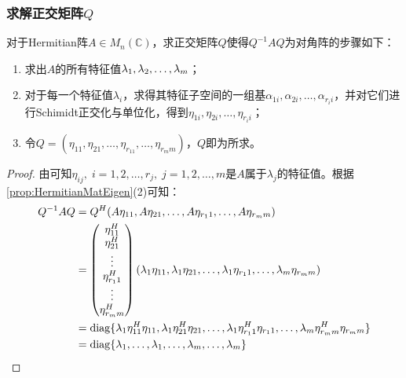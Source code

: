 \subsubsection{求解正交矩阵$Q$}
\begin{theorem}
	对于Hermitian阵$A\in M_{n}(\mathbb{C})$，求正交矩阵$Q$使得$Q^{-1}AQ$为对角阵的步骤如下：
	\begin{enumerate}
		\item 求出$A$的所有特征值$\lambda_1, \lambda_2, \dots, \lambda_{m}$；
		\item 对于每一个特征值$\lambda_i$，求得其特征子空间的一组基$\alpha_{1i},\alpha_{2i},\dots,\alpha_{r_ii}$，并对它们进行Schimidt正交化与单位化，得到$\eta_{1i},\eta_{2i},\dots,\eta_{r_ii}$；
		\item 令$Q=(\eta_{11},\eta_{21},\dots,\eta_{r_11},\dots,\eta_{r_mm})$，$Q$即为所求。
	\end{enumerate}
\end{theorem}
\begin{proof}
	由可知$\eta_{ij},\;i=1,2,\dots,r_j,\;j=1,2,\dots,m$是$A$属于$\lambda_j$的特征值。根据\cref{prop:HermitianMatEigen}(2)可知：
	\begin{align*}
		Q^{-1}AQ
		&=Q^H(A\eta_{11},A\eta_{21},\dots,A\eta_{r_11},\dots,A\eta_{r_mm}) \\
		&=
		\begin{pmatrix}
			\eta_{11}^H \\
			\eta_{21}^H \\
			\vdots \\
			\eta_{r_11}^H \\
			\vdots \\
			\eta_{r_mm}^H
		\end{pmatrix}
		(\lambda_1\eta_{11},\lambda_1\eta_{21},\dots,\lambda_1\eta_{r_11},\dots,\lambda_m\eta_{r_mm}) \\
		&=\operatorname{diag}\{\lambda_1\eta_{11}^H\eta_{11},\lambda_1\eta_{21}^H\eta_{21},\dots,\lambda_1\eta_{r_11}^H\eta_{r_11},\dots,\lambda_m\eta_{r_mm}^H\eta_{r_mm}\} \\
		&=\operatorname{diag}\{\lambda_1,\dots,\lambda_1,\dots,\lambda_m,\dots,\lambda_m\}\qedhere
	\end{align*}
\end{proof}
